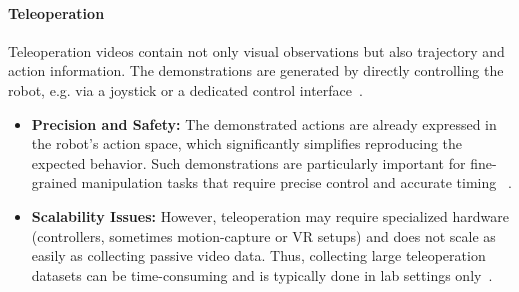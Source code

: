 \paragraph{Teleoperation}
Teleoperation videos contain not only visual observations but also trajectory and action information. 
The demonstrations are generated by directly controlling the robot, e.g. via a joystick or a dedicated control interface~\cite{McCarthy_2025}.
\begin{itemize}
	\item \textbf{Precision and Safety:} 
	The demonstrated actions are already expressed in the robot's action space, which significantly simplifies reproducing the expected behavior. Such demonstrations are particularly important for fine-grained manipulation tasks that require precise control and accurate timing ~\cite{McCarthy_2025}. 
	\item \textbf{Scalability Issues:} However, teleoperation may require specialized hardware (controllers, sometimes motion-capture or VR setups) and does not scale as easily as collecting passive video data. Thus, collecting large teleoperation datasets can be time-consuming and is typically done in lab settings only~\cite{McCarthy_2025}.
\end{itemize}

